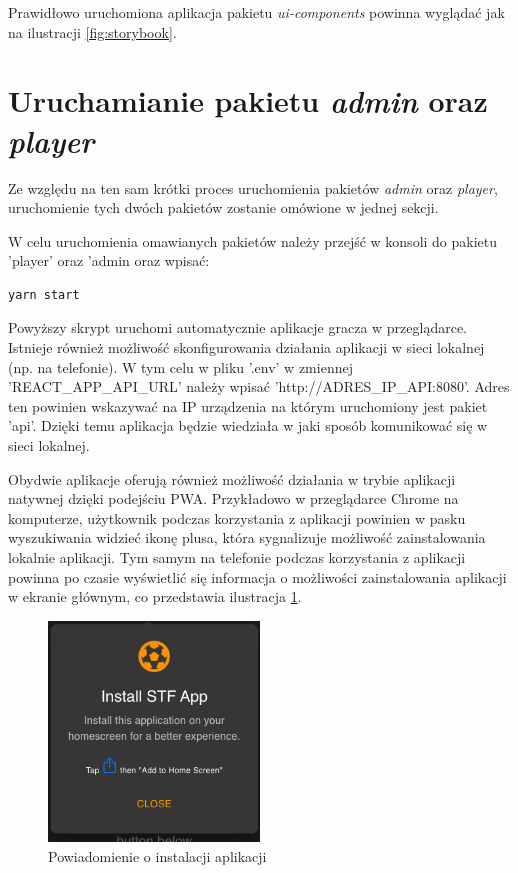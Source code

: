 Prawidłowo uruchomiona aplikacja pakietu \textit{ui-components} powinna wyglądać jak na ilustracji \ref{fig:storybook}.

\section{Uruchamianie pakietu \textit{admin} oraz \textit{player}}
Ze względu na ten sam krótki proces uruchomienia pakietów \textit{admin} oraz \textit{player}, uruchomienie tych dwóch pakietów zostanie omówione w jednej sekcji.

W celu uruchomienia omawianych pakietów należy przejść w konsoli do pakietu 'player' oraz 'admin oraz wpisać:

\begin{lstlisting}
yarn start
\end{lstlisting}

Powyższy skrypt uruchomi automatycznie aplikacje gracza w przeglądarce. Istnieje również możliwość skonfigurowania działania aplikacji w sieci lokalnej (np. na telefonie). W tym celu w pliku '.env' w zmiennej 'REACT\_APP\_API\_URL' należy wpisać 'http://{ADRES\_IP\_API}:8080'. Adres ten powinien wskazywać na IP urządzenia na którym uruchomiony jest pakiet 'api'. Dzięki temu aplikacja będzie wiedziała w jaki sposób komunikować się w sieci lokalnej.

Obydwie aplikacje oferują również możliwość działania w trybie aplikacji natywnej dzięki podejściu PWA. Przykładowo w przeglądarce Chrome na komputerze, użytkownik podczas korzystania z aplikacji powinien w pasku wyszukiwania widzieć ikonę plusa, która sygnalizuje możliwość zainstalowania lokalnie aplikacji. Tym samym na telefonie podczas korzystania z aplikacji powinna po czasie wyświetlić się informacja o możliwości zainstalowania aplikacji w ekranie głównym, co przedstawia ilustracja \ref{fig:pwa_promt}.

\begin{figure}[h!]
  \centering
    \includegraphics[width=0.5\textwidth]{images/player/PWA_promt.png}
  \caption{Powiadomienie o instalacji aplikacji}
  \label{fig:pwa_promt}
\end{figure}


